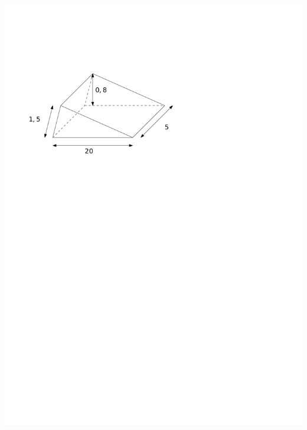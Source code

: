 \documentclass[a4paper,11pt]{report}
\begin{document}
\begin{exop}
{\begin{tasks}
    \task ~\\ \includegraphics[scale=0.5]{media/gm-02/prisme-triang2.pdf}

\end{tasks}}
\end{exop}
\end{document}
